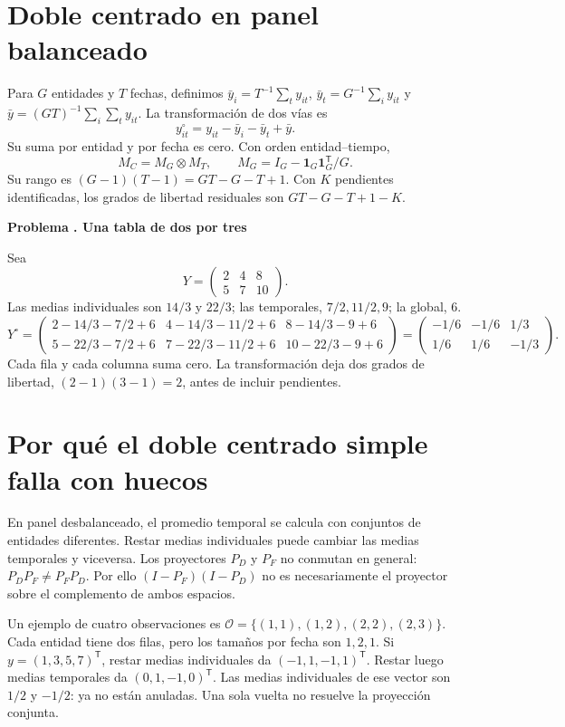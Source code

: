 \documentclass[11pt,a4paper]{article}
\newcommand{\T}{^{\mathsf T}}
\newcommand{\ones}{\mathbf 1}
\theoremstyle{definition}
\newcounter{problema}
\newenvironment{resuelto}[1]{\refstepcounter{problema}\par\medskip\Needspace{6\baselineskip}\textbf{Problema \theproblema. #1}\par}{\par\medskip}
\newcommand{\cO}{\mathcal O}
\begin{document}
\section{Doble centrado en panel balanceado}
Para $G$ entidades y $T$ fechas, definimos
$\bar y_i=T^{-1}\sum_ty_{it}$,
$\bar y_t=G^{-1}\sum_iy_{it}$ y
$\bar y=(GT)^{-1}\sum_i\sum_ty_{it}$.
La transformación de dos vías es
\[
y_{it}^{\circ}=y_{it}-\bar y_i-\bar y_t+\bar y.
\]
Su suma por entidad y por fecha es cero. Con orden entidad--tiempo,
\[
M_C=M_G\otimes M_T,\qquad
M_G=I_G-\ones_G\ones_G\T/G.
\]
Su rango es $(G-1)(T-1)=GT-G-T+1$.
Con $K$ pendientes identificadas, los grados de libertad residuales son
$GT-G-T+1-K$.

\begin{resuelto}{Una tabla de dos por tres}
Sea
\[
Y=\begin{pmatrix}2&4&8\\5&7&10\end{pmatrix}.
\]
Las medias individuales son $14/3$ y $22/3$; las temporales, $7/2,11/2,9$; la global, $6$.
\[
Y^\circ=
\begin{pmatrix}
2-14/3-7/2+6&4-14/3-11/2+6&8-14/3-9+6\\
5-22/3-7/2+6&7-22/3-11/2+6&10-22/3-9+6
\end{pmatrix}
=\begin{pmatrix}-1/6&-1/6&1/3\\1/6&1/6&-1/3\end{pmatrix}.
\]
Cada fila y cada columna suma cero. La transformación deja dos grados de libertad, $(2-1)(3-1)=2$, antes de incluir pendientes.
\end{resuelto}

\section{Por qué el doble centrado simple falla con huecos}
En panel desbalanceado, el promedio temporal se calcula con conjuntos de entidades diferentes. Restar medias individuales puede cambiar las medias temporales y viceversa. Los proyectores $P_D$ y $P_F$ no conmutan en general:
$P_DP_F\ne P_FP_D$.
Por ello $(I-P_F)(I-P_D)$ no es necesariamente el proyector sobre el complemento de ambos espacios.

Un ejemplo de cuatro observaciones es
$\cO=\{(1,1),(1,2),(2,2),(2,3)\}$.
Cada entidad tiene dos filas, pero los tamaños por fecha son $1,2,1$.
Si $y=(1,3,5,7)\T$, restar medias individuales da $(-1,1,-1,1)\T$.
Restar luego medias temporales da $(0,1,-1,0)\T$.
Las medias individuales de ese vector son $1/2$ y $-1/2$: ya no están anuladas. Una sola vuelta no resuelve la proyección conjunta.
\end{document}
